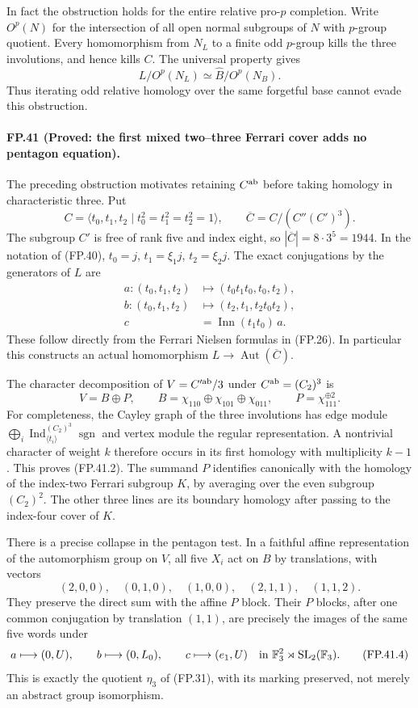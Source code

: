 In fact the obstruction holds for the entire relative pro-$p$
completion. Write $O^p(N)$ for the intersection of all open
normal subgroups of $N$ with $p$-group quotient. Every homomorphism
from $N_L$ to a finite odd $p$-group kills the three involutions,
and hence kills $C$. The universal property gives
\[
 L/O^p(N_L)\simeq\widehat B/O^p(N_B).
 \tag{FP.40.3}
\]
Thus iterating odd relative homology over the same forgetful
base cannot evade this obstruction.

\paragraph{FP.41 (Proved: the first mixed two--three Ferrari cover adds no pentagon equation).}
The preceding obstruction motivates retaining $C^{\rm ab}$
before taking homology in characteristic three. Put
\[
 C=\langle t_0,t_1,t_2\mid t_0^2=t_1^2=t_2^2=1\rangle,
 \qquad
 \overline C=C/(C''(C')^3).
\]
The subgroup $C'$ is free of rank five and index eight, so
$|\overline C|=8\cdot3^5=1944$. In the notation of (FP.40),
$t_0=j$, $t_1=\xi_1j$, $t_2=\xi_2j$. The exact conjugations
by the generators of $L$ are
\[
\begin{split}
 a:(t_0,t_1,t_2)&\longmapsto(t_0t_1t_0,t_0,t_2),\\
 b:(t_0,t_1,t_2)&\longmapsto(t_2,t_1,t_2t_0t_2),\\
 c&=\operatorname{Inn}(t_1t_0)\,a.
\end{split}
 \tag{FP.41.1}
\]
These follow directly from the Ferrari Nielsen formulas in
(FP.26). In particular this constructs an actual homomorphism
$L\to\operatorname{Aut}(\overline C)$.

The character decomposition of $V=C'^{\rm ab}/3$ under
$C^{\rm ab}=(C_2)^3$ is
\[
 V=B\oplus P,
 \qquad
 B=\chi_{110}\oplus\chi_{101}\oplus\chi_{011},
 \qquad P=\chi_{111}^{\oplus2}.
 \tag{FP.41.2}
\]
For completeness, the Cayley graph of the three involutions
has edge module $\bigoplus_i\operatorname{Ind}_{\langle t_i\rangle}^{(C_2)^3}
\operatorname{sgn}$ and vertex module the regular representation.
A nontrivial character of weight $k$ therefore occurs in its
first homology with multiplicity $k-1$. This proves (FP.41.2).
The summand $P$ identifies canonically with the homology of the
index-two Ferrari subgroup $K$, by averaging over the even
subgroup $(C_2)^2$. The other three lines are its boundary
homology after passing to the index-four cover of $K$.

There is a precise collapse in the pentagon test. In a faithful
affine representation of the automorphism group on $V$, all
five $X_i$ act on $B$ by translations, with vectors
\[
 (2,0,0),\quad(0,1,0),\quad(1,0,0),\quad
 (2,1,1),\quad(1,1,2).
 \tag{FP.41.3}
\]
They preserve the direct sum with the affine $P$ block. Their
$P$ blocks, after one common conjugation by translation $(1,1)$,
are precisely the images of the same five words under
\[
 a\longmapsto(0,U),\qquad
 b\longmapsto(0,L_0),\qquad
 c\longmapsto(e_1,U)
 \quad\hbox{in }\mathbb F_3^2\rtimes\operatorname{SL}_2(\mathbb F_3).
 \tag{FP.41.4}
\]
This is exactly the quotient $\eta_3$ of (FP.31), with its
marking preserved, not merely an abstract group isomorphism.

